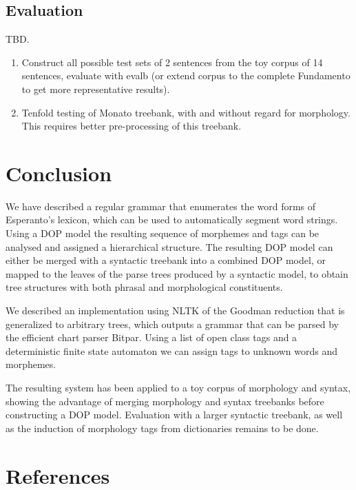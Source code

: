 \documentclass[10pt,a4paper]{article}
\begin{document}
\subsection{Evaluation}

TBD. 

\begin{enumerate}
\item Construct all possible test sets of 2 sentences from the toy corpus of 14
sentences, evaluate with evalb (or extend corpus to the complete
Fundamento to get more representative results).
\item Tenfold testing of Monato treebank, with and without regard for
morphology. This requires better pre-processing of this treebank.
\end{enumerate}

\section{Conclusion}

We have described a regular grammar that enumerates the word forms of
Esperanto's lexicon, which can be used to automatically segment word strings.
Using a DOP model the resulting sequence of morphemes and tags can be analysed
and assigned a hierarchical structure. The resulting DOP model can either be
merged with a syntactic treebank into a combined DOP model, or mapped to the
leaves of the parse trees produced by a syntactic model, to obtain tree
structures with both phrasal and morphological constituents.

We described an implementation using NLTK of the Goodman reduction that is
generalized to arbitrary trees, which outputs a grammar that can be parsed by
the efficient chart parser Bitpar. Using a list of open class tags and a
deterministic finite state automaton we can assign tags to unknown words and
morphemes.

The resulting system has been applied to a toy corpus of morphology and
syntax, showing the advantage of merging morphology and syntax treebanks
before constructing a DOP model. Evaluation with a larger syntactic treebank,
as well as the induction of morphology tags from dictionaries remains to be
done.


\section{References}
\end{document}
